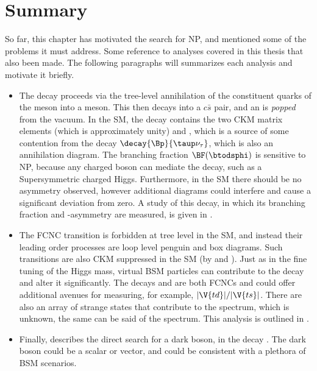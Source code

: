 \section{Summary}

So far, this chapter has motivated the search for NP, and mentioned some of the problems it must
address.
Some reference to analyses covered in this thesis that also been made.
The following paragraphs will summarizes each analysis and motivate it briefly.
\vspace{8pt}
\begin{flushright}
  \begin{minipage}{0.95\textwidth}
    \begin{itemize}
      \setlength{\itemsep}{8pt}
      \item[\Chap{ch:dsphi}]
        The decay \btodsphi proceeds via the tree-level annihilation of the constituent quarks of the \Bp
        meson into a \Wp meson.
        This then decays into a $c\bar s$ pair, and an \ssbar is \emph{popped} from the vacuum.
        In the SM, the decay contains the two CKM matrix elements  (which is approximately unity) and
        , which is a source of some contention from the decay $\decay{\Bp}{\taup\nu_\tau}$, which
        is also an annihilation diagram.
        The branching fraction $\BF(\btodsphi)$ is sensitive to NP, because any charged boson can mediate
        the decay, such as a Supersymmetric charged Higgs.
        Furthermore, in the SM there should be no \CP asymmetry observed, however additional diagrams could
        interfere and cause a significant deviation from zero.
        A study of this decay, in which its branching fraction and \CP-asymmetry are measured, is given in
        .
      \item[\Chap{ch:hhh}]
        The FCNC transition  is forbidden at tree level in the SM, and instead their
        leading order processes are loop level penguin and box diagrams.
        Such transitions are also CKM suppressed in the SM (by  and ).
        Just as in the fine tuning of the Higgs mass, virtual BSM particles can contribute to the decay and
        alter it significantly.
        The decays \btokpipimumu and \btophikmumu are both  FCNCs and could offer
        additional avenues for measuring, for example, $|\V{td}|/|\V{ts}|$.
        There are also an array of strange states that contribute to the \kpipi spectrum, which is unknown,
        the same can be said of the \phik spectrum.
        This analysis is outlined in .
      \item[\Chap{ch:db}]
        Finally,  describes the direct search for a dark boson, \decay{\db}{\mumu} in the
        decay \decay{\Bd}{\Kstarent\mumu}.
        The dark boson could be a scalar or vector, and could be consistent with a plethora of BSM
        scenarios.
    \end{itemize}
  \end{minipage}
\end{flushright}








